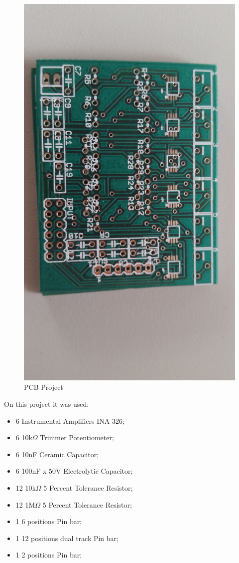 \begin{figure}[!htpb]
\centering
\caption{PCB Project}
\label{INA_PCB}
\includegraphics[scale=0.08]{images/INA_board}
\end{figure}

On this project it was used:

\begin{itemize}
\item 6 Instrumental Amplifiers INA 326;
\item 6 10k$\Omega$ Trimmer Potentiometer;
\item 6 10nF Ceramic Capacitor;
\item 6 100nF x 50V Electrolytic Capacitor;
\item 12 10k$\Omega$ 5 Percent Tolerance Resistor;
\item 12 1M$\Omega$ 5 Percent Tolerance Resistor;
\item 1 6 positions Pin bar;
\item 1 12 positions dual track Pin bar;
\item 1 2 positions Pin bar;
\end{itemize}

